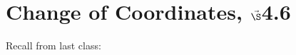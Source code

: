 


%

%

\section{{Change of Coordinates, $\vec\S$4.6}}%
% 

%
\thispagestyle{fancy}

Recall from last class:

